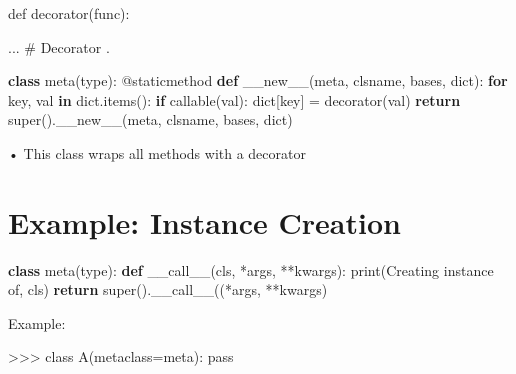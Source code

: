 \documentclass[
  letterpaper,
  DIV=11,
  numbers=noendperiod]{scrreprt}
\newenvironment{Shaded}{\begin{snugshade}}{\end{snugshade}}
\newcommand{\AttributeTok}[1]{\textcolor[rgb]{0.40,0.45,0.13}{#1}}
\newcommand{\BuiltInTok}[1]{\textcolor[rgb]{0.00,0.23,0.31}{#1}}
\newcommand{\ControlFlowTok}[1]{\textcolor[rgb]{0.00,0.23,0.31}{\textbf{#1}}}
\newcommand{\FunctionTok}[1]{\textcolor[rgb]{0.28,0.35,0.67}{#1}}
\newcommand{\KeywordTok}[1]{\textcolor[rgb]{0.00,0.23,0.31}{\textbf{#1}}}
\newcommand{\NormalTok}[1]{\textcolor[rgb]{0.00,0.23,0.31}{#1}}
\newcommand{\OperatorTok}[1]{\textcolor[rgb]{0.37,0.37,0.37}{#1}}
\newcommand{\StringTok}[1]{\textcolor[rgb]{0.13,0.47,0.30}{#1}}
\begin{document}
def decorator(func):

\begin{Shaded}
\begin{Highlighting}[]
\NormalTok{...   }
\NormalTok{\# Decorator   }
\NormalTok{. }
\end{Highlighting}
\end{Shaded}

\begin{Shaded}
\begin{Highlighting}[]
\KeywordTok{class}\NormalTok{ meta(}\BuiltInTok{type}\NormalTok{):}
    \AttributeTok{@staticmethod}
    \KeywordTok{def} \FunctionTok{\_\_new\_\_}\NormalTok{(meta, clsname, bases, }\BuiltInTok{dict}\NormalTok{):}
        \ControlFlowTok{for}\NormalTok{ key, val }\KeywordTok{in} \BuiltInTok{dict}\NormalTok{.items():}
            \ControlFlowTok{if} \BuiltInTok{callable}\NormalTok{(val):}
                \BuiltInTok{dict}\NormalTok{[key] }\OperatorTok{=}\NormalTok{ decorator(val)}
            \ControlFlowTok{return} \BuiltInTok{super}\NormalTok{().}\FunctionTok{\_\_new\_\_}\NormalTok{(meta, clsname, bases, }\BuiltInTok{dict}\NormalTok{) }
\end{Highlighting}
\end{Shaded}

• This class wraps all methods with a decorator


\chapter{Example: Instance Creation}\label{example-instance-creation}

\begin{Shaded}
\begin{Highlighting}[]
\KeywordTok{class}\NormalTok{ meta(}\BuiltInTok{type}\NormalTok{): }\KeywordTok{def} \FunctionTok{\_\_call\_\_}\NormalTok{(cls, }\OperatorTok{*}\NormalTok{args, }\OperatorTok{**}\NormalTok{kwargs): }\BuiltInTok{print}\NormalTok{(}\StringTok{\textquotesingle{}Creating instance of\textquotesingle{}}\NormalTok{, cls) }\ControlFlowTok{return} \BuiltInTok{super}\NormalTok{().}\FunctionTok{\_\_call\_\_}\NormalTok{((}\OperatorTok{*}\NormalTok{args, }\OperatorTok{**}\NormalTok{kwargs) }
\end{Highlighting}
\end{Shaded}

Example:

\begin{Shaded}
\begin{Highlighting}[]
\NormalTok{\textgreater{}\textgreater{}\textgreater{} class A(metaclass=meta): pass }
\end{Highlighting}
\end{Shaded}
\end{document}
